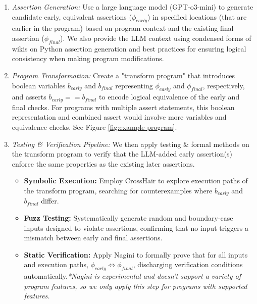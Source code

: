 \documentclass[8pt]{extarticle}
\begin{document}
\begin{enumerate}
    \item \textit{Assertion Generation:} Use a large language model (GPT-o3-mini) to generate candidate early, equivalent assertions (\(\phi_{early}\)) in specified locations (that are earlier in the program) based on program context and the existing final assertion (\(\phi_{final}\)). We also provide the LLM context using condensed forms of wikis on Python assertion generation and best practices for ensuring logical consistency when making program modifications.  
    \item \textit{Program Transformation:} Create a "transform program" that introduces boolean variables \(b_{early}\) and \(b_{final}\) representing \(\phi_{early}\) and \(\phi_{final}\), respectively, and asserts \(b_{early} == b_{final}\) to encode logical equivalence of the early and final checks. For programs with multiple assert statements, this boolean representation and combined assert would involve more variables and equivalence checks. See Figure \ref{fig:example-program}. 
    \item \textit{Testing \& Verification Pipeline:} We then apply testing \& formal methods on the transform program to verify that the LLM-added early assertion(s) enforce the same properties as the existing later assertions.

    \begin{itemize}
        \item \textbf{Symbolic Execution:} Employ CrossHair to explore execution paths of the transform program, searching for counterexamples where \(b_{early}\) and \(b_{final}\) differ.
        \item \textbf{Fuzz Testing:} Systematically generate random and boundary-case inputs designed to violate assertions, confirming that no input triggers a mismatch between early and final assertions.
        \item \textbf{Static Verification:} Apply Nagini to formally prove that for all inputs and execution paths, \(\phi_{early} \Leftrightarrow \phi_{final}\), discharging verification conditions automatically.\textit{*Nagini is experimental and doesn't support a variety of program features, so we only apply this step for programs with supported features. }
    \end{itemize}
\end{enumerate}
\end{document}
